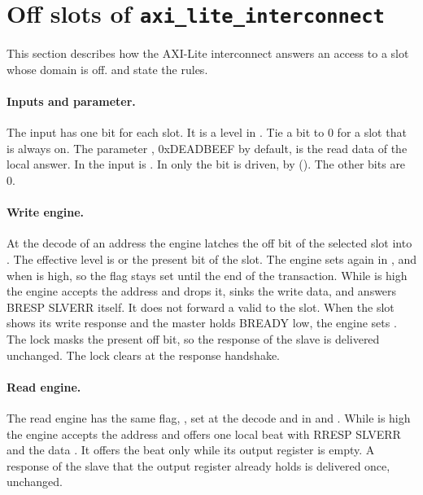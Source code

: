 \section{Off slots of \texttt{axi\_lite\_interconnect}}\label{tm:mod:axi-lite-interconnect}
This section describes how the AXI-Lite interconnect answers an access to a slot whose domain is off.  and  state the rules.

\paragraph{Inputs and parameter.} The input  has one bit for each slot. It is a level in . Tie a bit to 0 for a slot that is always on. The parameter , 0xDEADBEEF by default, is the read data of the local answer. In  the input is . In  only the bit  is driven, by  (). The other bits are 0.

\paragraph{Write engine.} At the decode of an address the engine latches the off bit of the selected slot into . The effective level  is  or the present bit of the slot. The engine sets  again in ,  and  when  is high, so the flag stays set until the end of the transaction. While  is high the engine accepts the address and drops it, sinks the write data, and answers BRESP SLVERR itself. It does not forward a valid to the slot. When the slot shows its write response and the master holds BREADY low, the engine sets . The lock masks the present off bit, so the response of the slave is delivered unchanged. The lock clears at the response handshake.

\paragraph{Read engine.} The read engine has the same flag, , set at the decode and in  and . While  is high the engine accepts the address and offers one local beat with RRESP SLVERR and the data . It offers the beat only while its output register is empty. A response of the slave that the output register already holds is delivered once, unchanged.


